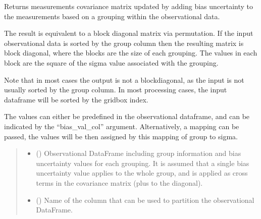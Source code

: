 \documentclass[letterpaper,10pt,english]{sphinxmanual}
\begin{document}
\begin{fulllineitems}
\label{\detokenize{error_covariance:glomar_gridding.error_covariance.correlated_components}}
\pysigstartsignatures
\pysiglinewithargsret
{}
{\sphinxparamcomma {}\sphinxparamcomma {}\sphinxparamcomma {}}
{}
\pysigstopsignatures
\sphinxAtStartPar
Returns measurements covariance matrix updated by adding bias uncertainty to
the measurements based on a grouping within the observational data.

\sphinxAtStartPar
The result is equivalent to a block diagonal matrix via permutation. If the
input observational data is sorted by the group column then the resulting
matrix is block diagonal, where the blocks are the size of each grouping.
The values in each block are the square of the sigma value associated with
the grouping.

\sphinxAtStartPar
Note that in most cases the output is not a block\sphinxhyphen{}diagonal, as the input
is not usually sorted by the group column. In most processing cases, the
input dataframe will be sorted by the gridbox index.

\sphinxAtStartPar
The values can either be pre\sphinxhyphen{}defined in the observational dataframe, and
can be indicated by the “bias\_val\_col” argument. Alternatively, a mapping
can be passed, the values will be then assigned by this mapping of group to
sigma.
\begin{quote}\begin{description}
\begin{itemize}
\item {}
\sphinxAtStartPar
{} () \textendash{} Observational DataFrame including group information and bias uncertainty
values for each grouping. It is assumed that a single bias uncertainty
value applies to the whole group, and is applied as cross terms in the
covariance matrix (plus to the diagonal).

\item {}
\sphinxAtStartPar
{} () \textendash{} Name of the column that can be used to partition the observational
DataFrame.


\end{itemize}
\end{description}
\end{quote}
\end{fulllineitems}
\end{document}
